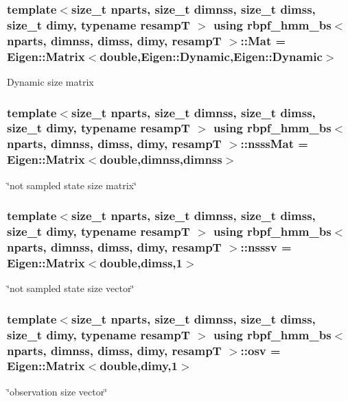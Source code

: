 \subsubsection[{\texorpdfstring{Mat}{Mat}}]{\setlength{\rightskip}{0pt plus 5cm}template$<$size\+\_\+t nparts, size\+\_\+t dimnss, size\+\_\+t dimss, size\+\_\+t dimy, typename resampT $>$ using {\bf rbpf\+\_\+hmm\+\_\+bs}$<$ nparts, dimnss, dimss, dimy, resampT $>$\+::{\bf Mat} =  Eigen\+::\+Matrix$<$double,Eigen\+::\+Dynamic,Eigen\+::\+Dynamic$>$}\hypertarget{classrbpf__hmm__bs_a8f6996a1394c31ac65859de96f195f3a}{}\label{classrbpf__hmm__bs_a8f6996a1394c31ac65859de96f195f3a}
Dynamic size matrix 
\subsubsection[{\texorpdfstring{nsss\+Mat}{nsssMat}}]{\setlength{\rightskip}{0pt plus 5cm}template$<$size\+\_\+t nparts, size\+\_\+t dimnss, size\+\_\+t dimss, size\+\_\+t dimy, typename resampT $>$ using {\bf rbpf\+\_\+hmm\+\_\+bs}$<$ nparts, dimnss, dimss, dimy, resampT $>$\+::{\bf nsss\+Mat} =  Eigen\+::\+Matrix$<$double,dimnss,dimnss$>$}\hypertarget{classrbpf__hmm__bs_a1bd1ebb6af375d962ba266b4ed5434a1}{}\label{classrbpf__hmm__bs_a1bd1ebb6af375d962ba266b4ed5434a1}
\char`\"{}not sampled state size matrix\char`\"{} 
\subsubsection[{\texorpdfstring{nsssv}{nsssv}}]{\setlength{\rightskip}{0pt plus 5cm}template$<$size\+\_\+t nparts, size\+\_\+t dimnss, size\+\_\+t dimss, size\+\_\+t dimy, typename resampT $>$ using {\bf rbpf\+\_\+hmm\+\_\+bs}$<$ nparts, dimnss, dimss, dimy, resampT $>$\+::{\bf nsssv} =  Eigen\+::\+Matrix$<$double,dimss,1$>$}\hypertarget{classrbpf__hmm__bs_ad348eec8ba6e192775ff7a7b4a288809}{}\label{classrbpf__hmm__bs_ad348eec8ba6e192775ff7a7b4a288809}
\char`\"{}not sampled state size vector\char`\"{} 
\subsubsection[{\texorpdfstring{osv}{osv}}]{\setlength{\rightskip}{0pt plus 5cm}template$<$size\+\_\+t nparts, size\+\_\+t dimnss, size\+\_\+t dimss, size\+\_\+t dimy, typename resampT $>$ using {\bf rbpf\+\_\+hmm\+\_\+bs}$<$ nparts, dimnss, dimss, dimy, resampT $>$\+::{\bf osv} =  Eigen\+::\+Matrix$<$double,dimy,1$>$}\hypertarget{classrbpf__hmm__bs_a9a830ec4bbd37d4922011165aa5a8037}{}\label{classrbpf__hmm__bs_a9a830ec4bbd37d4922011165aa5a8037}
\char`\"{}observation size vector\char`\"{} 
